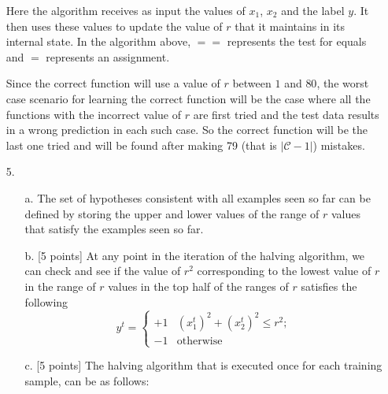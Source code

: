 \begin{enumerate}
Here the algorithm receives as input the values of $x_1$, $x_2$ and the label $y$. It then uses these values to update the value of $r$ that it maintains in its internal state. In the algorithm above, $==$ represents the test for equals and $=$ represents an assignment.

Since the correct function will use a value of $r$ between $1$ and $80$, the worst case scenario for learning the correct function will be the case where all the functions with the incorrect value of $r$ are first tried and the test data results in a wrong prediction in each such case. So the correct function will be the last one tried and will be found after making 79 (that is $\left | \mathcal{C} - 1 \right |$) mistakes. 

\item[5.] 
  \begin{enumerate}
  \item[a.] The set of hypotheses consistent with all examples seen so far can be defined by storing the upper and lower values of the range of $r$ values that satisfy the examples seen so far.
  \item[b.] [5 points] At any point in the iteration of the halving algorithm, we can check and see if the value of $r^2$ corresponding to the lowest value of $r$ in the range of $r$ values in the top half of the ranges of $r$ satisfies the following
   \begin{equation*}
y^t = \left\{
    \begin{array}{rl}
      +1 & (x_1^t)^2 + (x_2^t)^2 \leq r^2;\\
      -1 & \mbox{otherwise}
    \end{array}
\right.
\label{eq:f_r}
\end{equation*}

  \item[c.] [5 points] The halving algorithm that is executed once for each training sample, can be as follows:
  

\end{enumerate}
\end{enumerate}
